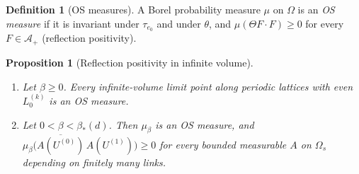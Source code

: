 \documentclass[11pt,a4paper]{article}
\newtheorem{proposition}[theorem]{Proposition}
\theoremstyle{definition}
\newtheorem{definition}[theorem]{Definition}
\theoremstyle{remark}
\newcommand{\cA}{\mathcal{A}}
\newcommand{\bS}{\beta_*}
\begin{document}
\begin{definition}[OS measures]\label{iv:def:OSmeasure}
A Borel probability measure $\mu$ on $\Omega$ is an \emph{OS measure} if it is invariant under $\tau_{e_0}$ and under $\theta$, and
$\mu(\Theta F\cdot F)\ge0$ for every $F\in\cA_+$ (reflection positivity).
\end{definition}

\begin{proposition}[Reflection positivity in infinite volume]\label{iv:prop:rp}
\begin{enumerate}[label=(\alph*)]
\item Let $\beta\ge0$. Every infinite-volume limit point along periodic lattices with even $L^{(k)}_0$ is an OS measure.
\item Let $0<\beta<\bS(d)$. Then $\mu_\beta$ is an OS measure, and $\mu_\beta\bigl(\overline{A(U^{(0)})}\,A(U^{(1)})\bigr)\ge0$ for
every bounded measurable $A$ on $\Omega_s$ depending on finitely many links.
\end{enumerate}
\end{proposition}
\end{document}
